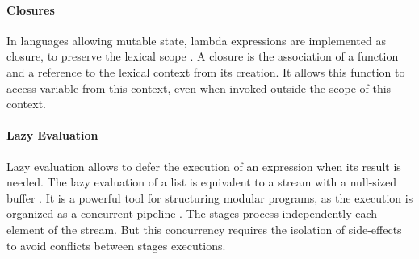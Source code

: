 \paragraph{Closures}
In languages allowing mutable state, lambda expressions are implemented as closure, to preserve the lexical scope \cite{Sussman1998}.
A closure is the association of a function and a reference to the lexical context from its creation.
It allows this function to access variable from this context, even when invoked outside the scope of this context.

\paragraph{Lazy Evaluation}
Lazy evaluation allows to defer the execution of an expression when its result is needed.
The lazy evaluation of a list is equivalent to a stream with a null-sized buffer \cite{VanRoy2003}. %
It is a powerful tool for structuring modular programs, as the execution is organized as a concurrent pipeline \cite{Sussman1983}.
The stages process independently each element of the stream.
But this concurrency requires the isolation of side-effects to avoid conflicts between stages executions.









